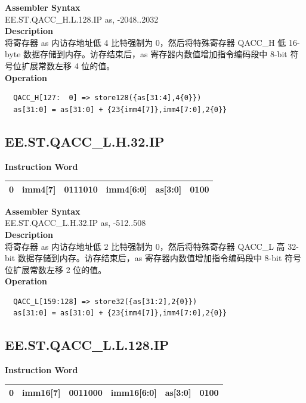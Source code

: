 \textbf{Assembler Syntax} \\
EE.ST.QACC\_H.L.128.IP as, -2048..2032 \\
\textbf{Description} \\
将寄存器 as 内访存地址低 4 比特强制为 0，然后将特殊寄存器 QACC\_H 低 16-byte 数据存储到内存。访存结束后，as 寄存器内数值增加指令编码段中 8-bit 符号位扩展常数左移 4 位的值。\\
\textbf{Operation}
\begin{lstlisting}
  QACC_H[127:  0] => store128({as[31:4],4{0}})
  as[31:0] = as[31:0] + {23{imm4[7]},imm4[7:0],2{0}}
\end{lstlisting}

\clearpage
\subsection{EE.ST.QACC\_L.H.32.IP}\label{instruction:EESTQACCLH32IP}
\setlength\tabcolsep{6pt}
\textbf{Instruction Word} \\
\begin{tabular}{|c|c|c|c|c|c|}
	\hline
	0 & imm4[7] & 0111010 & imm4[6:0] & as[3:0] & 0100 \\
	\hline
\end{tabular}

\textbf{Assembler Syntax} \\
EE.ST.QACC\_L.H.32.IP as, -512..508 \\
\textbf{Description} \\
将寄存器 as 内访存地址低 2 比特强制为 0，然后将特殊寄存器 QACC\_L 高 32-bit 数据存储到内存。访存结束后，as 寄存器内数值增加指令编码段中 8-bit 符号位扩展常数左移 2 位的值。\\
\textbf{Operation}
\begin{lstlisting}
  QACC_L[159:128] => store32({as[31:2],2{0}})
  as[31:0] = as[31:0] + {23{imm4[7]},imm4[7:0],2{0}}
\end{lstlisting}

\clearpage
\subsection{EE.ST.QACC\_L.L.128.IP}\label{instruction:EESTQACCLL128IP}
\setlength\tabcolsep{6pt}
\textbf{Instruction Word} \\
\begin{tabular}{|c|c|c|c|c|c|}
	\hline
	0 & imm16[7] & 0011000 & imm16[6:0] & as[3:0] & 0100 \\
	\hline
\end{tabular}

